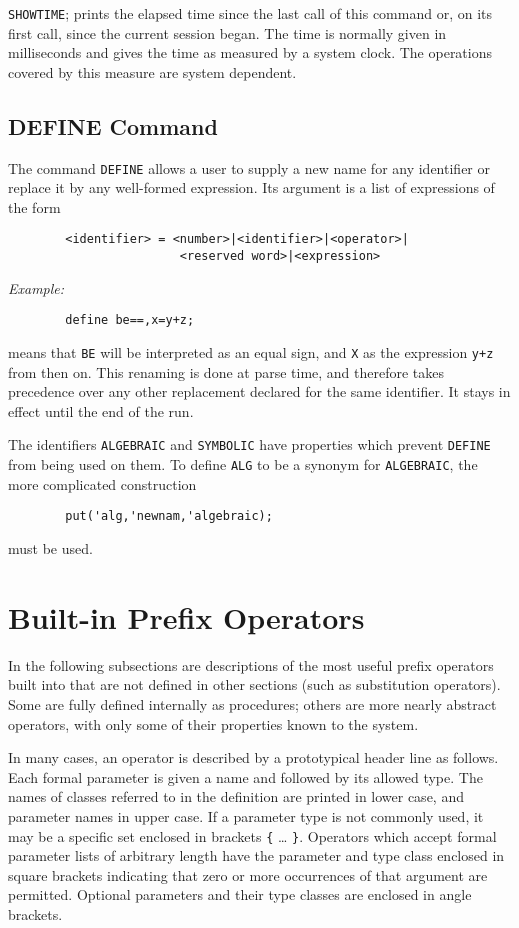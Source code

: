 {\tt SHOWTIME}; prints the elapsed time since the last call of this
command or, on its first call, since the current {\REDUCE} session began.
The time is normally given in milliseconds and gives the time as measured
by a system clock.  The operations covered by this measure are system
dependent.

\section{DEFINE Command}

The command {\tt DEFINE}  allows a user to supply a new name for
any identifier or replace it by any well-formed expression.  Its argument
is a list of expressions of the form
\begin{verbatim}
        <identifier> = <number>|<identifier>|<operator>|
                        <reserved word>|<expression>
\end{verbatim}

{\it Example:}
\begin{verbatim}
        define be==,x=y+z;
\end{verbatim}
means that {\tt BE} will be interpreted as an equal sign, and {\tt X}
as the expression {\tt y+z} from then on.  This renaming is done at parse
time, and therefore takes precedence over any other replacement declared
for the same identifier.  It stays in effect until the end of the
{\REDUCE} run.

The identifiers {\tt ALGEBRAIC} and {\tt SYMBOLIC} have properties which
prevent {\tt DEFINE}  from being used on them.  To define
{\tt ALG} to be a synonym for {\tt ALGEBRAIC}, the more complicated
construction
\begin{verbatim}
        put('alg,'newnam,'algebraic);
\end{verbatim}
must be used.

\chapter{Built-in Prefix Operators}
In the following subsections are descriptions of the most useful prefix
operators built into {\REDUCE} that are not defined in other sections (such
as substitution operators). Some are fully defined internally as
procedures; others are more nearly abstract operators, with only some of
their properties known to the system.

In many cases, an operator is described by a prototypical header line as
follows. Each formal parameter is given a name and followed by its allowed
type. The names of classes referred to in the definition are printed in
lower case, and parameter names in upper case. If a parameter type is not
commonly used, it may be a specific set enclosed in brackets {\tt \{} \ldots
{\tt \}}.
Operators which accept formal parameter lists of arbitrary length have the
parameter and type class enclosed in square brackets indicating that zero
or more occurrences of that argument are permitted. Optional parameters
and their type classes are enclosed in angle brackets.

